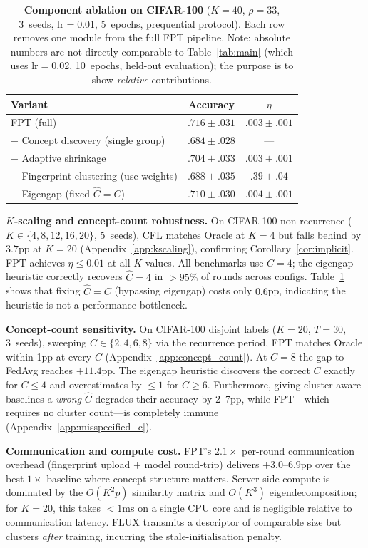 \documentclass[11pt]{article}
\begin{document}
\begin{table}[t]
\centering
\caption{\textbf{Component ablation on CIFAR-100} ($K{=}40$, $\rho{=}33$, 3~seeds, lr$=$0.01, 5~epochs, prequential protocol). Each row removes one module from the full FPT pipeline. Note: absolute numbers are not directly comparable to Table~\ref{tab:main} (which uses lr$=$0.02, 10~epochs, held-out evaluation); the purpose is to show \emph{relative} contributions.}
\label{tab:ablation}
\small
\begin{tabular}{@{}lcc@{}}
\toprule
Variant & Accuracy & $\eta$ \\
\midrule
FPT (full) & $.716 \pm .031$ & $.003 \pm .001$ \\
\quad $-$ Concept discovery (single group) & $.684 \pm .028$ & --- \\
\quad $-$ Adaptive shrinkage & $.704 \pm .033$ & $.003 \pm .001$ \\
\quad $-$ Fingerprint clustering (use weights) & $.688 \pm .035$ & $.39 \pm .04$ \\
\quad $-$ Eigengap (fixed $\hat C = C$) & $.710 \pm .030$ & $.004 \pm .001$ \\
\bottomrule
\end{tabular}
\end{table}

\textbf{$K$-scaling and concept-count robustness.}
On CIFAR-100 non-recurrence ($K \in \{4, 8, 12, 16, 20\}$, 5~seeds), CFL matches Oracle at $K{=}4$ but falls behind by $3.7$pp at $K{=}20$ (Appendix~\ref{app:kscaling}), confirming Corollary~\ref{cor:implicit}.
FPT achieves $\eta \le 0.01$ at all $K$ values.
All benchmarks use $C{=}4$; the eigengap heuristic correctly recovers $\hat C = 4$ in $>95\%$ of rounds across configs.
Table~\ref{tab:ablation} shows that fixing $\hat C = C$ (bypassing eigengap) costs only $0.6$pp, indicating the heuristic is not a performance bottleneck.

\textbf{Concept-count sensitivity.}
On CIFAR-100 disjoint labels ($K{=}20$, $T{=}30$, 3~seeds), sweeping $C \in \{2,4,6,8\}$ via the recurrence period, FPT matches Oracle within 1pp at every $C$ (Appendix~\ref{app:concept_count}).
At $C{=}8$ the gap to FedAvg reaches $+11.4$pp.
The eigengap heuristic discovers the correct $C$ exactly for $C \le 4$ and overestimates by $\le 1$ for $C \ge 6$.
Furthermore, giving cluster-aware baselines a \emph{wrong} $\hat C$ degrades their accuracy by 2--7pp, while FPT---which requires no cluster count---is completely immune (Appendix~\ref{app:misspecified_c}).

\textbf{Communication and compute cost.}
FPT's $2.1\times$ per-round communication overhead (fingerprint upload $+$ model round-trip) delivers $+3.0$--$6.9$pp over the best $1\times$ baseline where concept structure matters.
Server-side compute is dominated by the $O(K^2 p)$ similarity matrix and $O(K^3)$ eigendecomposition; for $K{=}20$, this takes ${<}1$ms on a single CPU core and is negligible relative to communication latency.
FLUX transmits a descriptor of comparable size but clusters \emph{after} training, incurring the stale-initialisation penalty.
\end{document}
